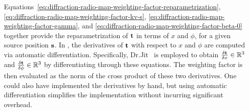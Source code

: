 Equations~\eqref{eq:diffraction-radio-map-weighting-factor-reparametrization}, \eqref{eq:diffraction-radio-map-weighting-factor-kv-s}, \eqref{eq:diffraction-radio-map-weighting-factor-gamma}, and \eqref{eq:diffraction-radio-map-weighting-factor-beta-0} together provide the reparametrization of $\mathbf{t}$ in terms of $x$ and $\phi$, for a given source position $\mathbf{s}$.
In \SRT{}, the derivatives of $\mathbf{t}$ with respect to $x$ and $\phi$ are computed via automatic differentiation.
Specifically, Dr.Jit~\cite{Jakob2022DrJit} is employed to obtain $\frac{\delta \mathbf{t}}{\delta x} \in \mathbb{R}^3$ and $\frac{\delta \mathbf{t}}{\delta \phi} \in \mathbb{R}^3$ by differentiating through these equations. The weighting factor is then evaluated as the norm of the cross product of these two derivatives.
One could also have implemented the derivatives by hand, but using automatic differentiation simplifies the implementation without incurring significant overhead.